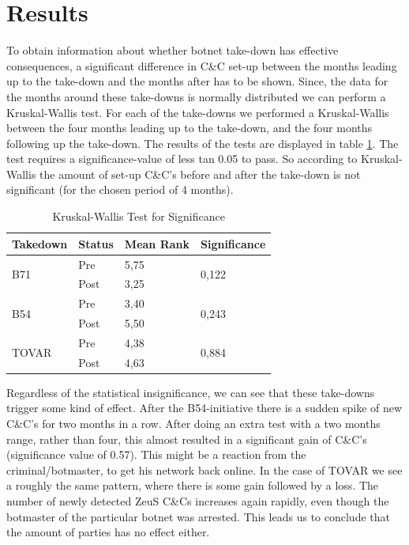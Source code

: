 \documentclass{sig-alternate-br}
\begin{document}
\section{Results}
To obtain information about whether botnet take-down has effective consequences, a significant difference in C\&C set-up between the months leading up to the take-down and the months after has to be shown. Since, the data for the months around these take-downs is normally distributed we can perform a Kruskal-Wallis test. For each of the take-downs we performed a Kruskal-Wallis between the four months leading up to the take-down, and the four months following up the take-down. The results of the tests are displayed in table \ref{table:kruskal}. The test requires a significance-value of less tan 0.05 to pass. So according to Kruskal-Wallis the amount of set-up C\&C's before and after the take-down is not significant (for the chosen period of 4 months).

\begin{table}[]
\centering
\caption{Kruskal-Wallis Test for Significance}
\label{table:kruskal}
\begin{tabular}{|l|l|l|l|}
\hline
\textbf{Takedown}      & \textbf{Status} & \textbf{Mean Rank} & \textbf{Significance}  \\ \hline
\multirow{2}{*}{B71}   & Pre             & 5,75               & \multirow{2}{*}{0,122} \\ \cline{2-3}
                       & Post            & 3,25               &                        \\ \hline
\multirow{2}{*}{B54}   & Pre             & 3,40               & \multirow{2}{*}{0,243} \\ \cline{2-3}
                       & Post            & 5,50               &                        \\ \hline
\multirow{2}{*}{TOVAR} & Pre             & 4,38               & \multirow{2}{*}{0,884} \\ \cline{2-3}
                       & Post            & 4,63               &                        \\ \hline
\end{tabular}
\end{table}

Regardless of the statistical insignificance, we can see that these take-downs trigger some kind of effect. After the B54-initiative there is a sudden spike of new C\&C's for two months in a row. After doing an extra test with a two months range, rather than four, this almost resulted in a significant gain of C\&C's (significance value of 0.57). This might be a reaction from the criminal/botmaster, to get his network back online. In the case of TOVAR we see a roughly the same pattern, where there is some gain followed by a loss. The number of newly detected ZeuS C\&Cs increases again rapidly, even though the botmaster of the particular botnet was arrested. This leads us to conclude that the amount of parties has no effect either.
\end{document}
